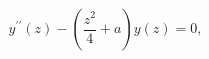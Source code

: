\begin{equation}
y^{\prime \prime }(z)-\left( \frac{z^{2}}{4}+a\right) y(z)=0,  \label{eq9}
\end{equation}

